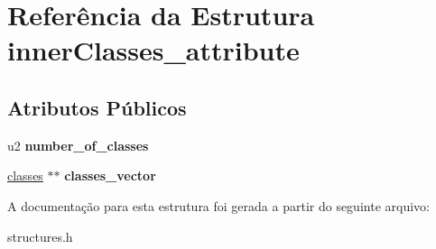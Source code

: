 \hypertarget{structinnerClasses__attribute}{}\section{Referência da Estrutura inner\+Classes\+\_\+attribute}
\label{structinnerClasses__attribute}
\subsection*{Atributos Públicos}
\begin{DoxyCompactItemize}
\item 
\mbox{\label{structinnerClasses__attribute_a5025605be4999db69f5cf0309fa1e443}} 
u2 {\bfseries number\+\_\+of\+\_\+classes}
\item 
\mbox{\label{structinnerClasses__attribute_a0179ecaaf1ae3febfc8553dcfb278679}} 
\hyperlink{structclasses}{classes} $\ast$$\ast$ {\bfseries classes\+\_\+vector}
\end{DoxyCompactItemize}


A documentação para esta estrutura foi gerada a partir do seguinte arquivo\+:\begin{DoxyCompactItemize}
\item 
structures.\+h\end{DoxyCompactItemize}
